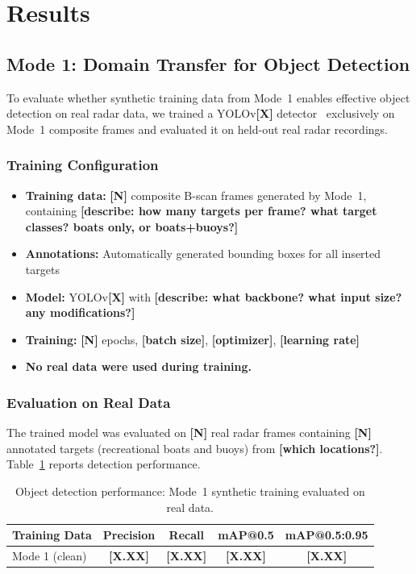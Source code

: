 \documentclass[twocolumn, 10pt]{article}
\newcommand{\ph}[1]{\textbf{[#1]}}
\begin{document}
\section{Results}
\label{sec:results}

\subsection{Mode 1: Domain Transfer for Object Detection}

To evaluate whether synthetic training data from Mode~1 enables effective object detection on real radar data, we trained a YOLOv\ph{X} detector~\cite{jocher2023yolov8} exclusively on Mode~1 composite frames and evaluated it on held-out real radar recordings.

\subsubsection{Training Configuration}

\begin{itemize}
    \item \textbf{Training data:} \ph{N} composite B-scan frames generated by Mode~1, containing \ph{describe: how many targets per frame? what target classes? boats only, or boats+buoys?}
    \item \textbf{Annotations:} Automatically generated bounding boxes for all inserted targets
    \item \textbf{Model:} YOLOv\ph{X} with \ph{describe: what backbone? what input size? any modifications?}
    \item \textbf{Training:} \ph{N} epochs, \ph{batch size}, \ph{optimizer}, \ph{learning rate}
    \item \textbf{No real data were used during training.}
\end{itemize}

\subsubsection{Evaluation on Real Data}

The trained model was evaluated on \ph{N} real radar frames containing \ph{N} annotated targets (recreational boats and buoys) from \ph{which locations?}. Table~\ref{tab:yolo_results} reports detection performance.

\begin{table}[htb]
\centering
\caption{Object detection performance: Mode~1 synthetic training evaluated on real data.}
\label{tab:yolo_results}
\begin{tabular}{@{}lcccc@{}}
\toprule
\textbf{Training Data} & \textbf{Precision} & \textbf{Recall} & \textbf{mAP@0.5} & \textbf{mAP@0.5:0.95} \\
\midrule
Mode 1 (clean) & \ph{X.XX} & \ph{X.XX} & \ph{X.XX} & \ph{X.XX} \\
\bottomrule
\end{tabular}
\end{table}
\end{document}
